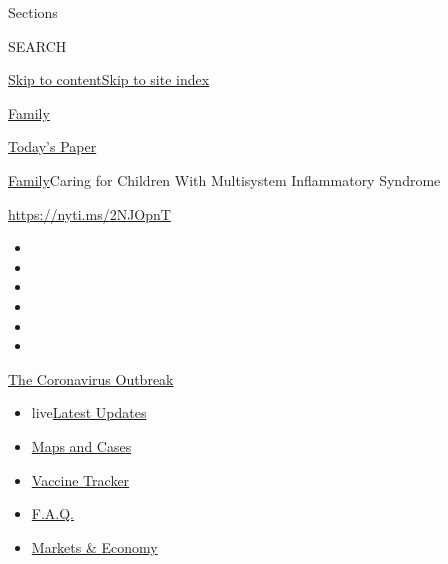 Sections

SEARCH

\protect\hyperlink{site-content}{Skip to
content}\protect\hyperlink{site-index}{Skip to site index}

\href{https://www.nytimes.com/section/well/family}{Family}

\href{https://myaccount.nytimes.com/auth/login?response_type=cookie\&client_id=vi}{}

\href{https://www.nytimes.com/section/todayspaper}{Today's Paper}

\href{/section/well/family}{Family}\textbar{}Caring for Children With
Multisystem Inflammatory Syndrome

\href{https://nyti.ms/2NJOpnT}{https://nyti.ms/2NJOpnT}

\begin{itemize}
\item
\item
\item
\item
\item
\item
\end{itemize}

\href{https://www.nytimes.com/news-event/coronavirus?action=click\&pgtype=Article\&state=default\&region=TOP_BANNER\&context=storylines_menu}{The
Coronavirus Outbreak}

\begin{itemize}
\tightlist
\item
  live\href{https://www.nytimes.com/2020/08/08/world/coronavirus-updates.html?action=click\&pgtype=Article\&state=default\&region=TOP_BANNER\&context=storylines_menu}{Latest
  Updates}
\item
  \href{https://www.nytimes.com/interactive/2020/us/coronavirus-us-cases.html?action=click\&pgtype=Article\&state=default\&region=TOP_BANNER\&context=storylines_menu}{Maps
  and Cases}
\item
  \href{https://www.nytimes.com/interactive/2020/science/coronavirus-vaccine-tracker.html?action=click\&pgtype=Article\&state=default\&region=TOP_BANNER\&context=storylines_menu}{Vaccine
  Tracker}
\item
  \href{https://www.nytimes.com/interactive/2020/world/coronavirus-tips-advice.html?action=click\&pgtype=Article\&state=default\&region=TOP_BANNER\&context=storylines_menu}{F.A.Q.}
\item
  \href{https://www.nytimes.com/live/2020/08/07/business/stock-market-today-coronavirus?action=click\&pgtype=Article\&state=default\&region=TOP_BANNER\&context=storylines_menu}{Markets
  \& Economy}
\end{itemize}

